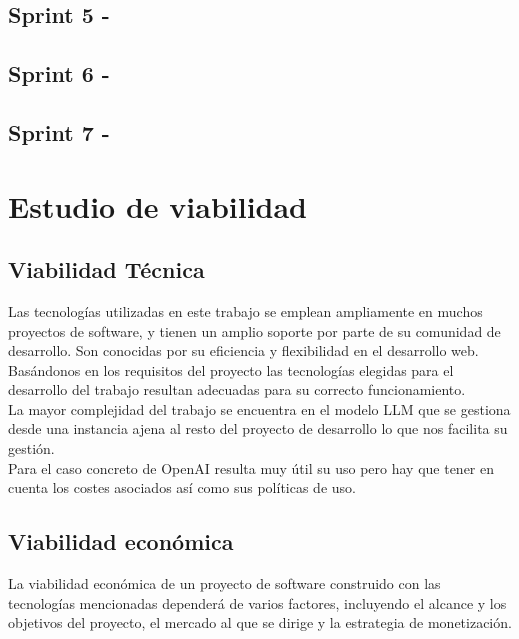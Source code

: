 \subsection{Sprint 5 - }
\subsection{Sprint 6 - }
\subsection{Sprint 7 - }

\section{Estudio de viabilidad}

\subsection{Viabilidad Técnica}

Las tecnologías utilizadas en este trabajo se emplean ampliamente en muchos proyectos de software, y 
tienen un amplio soporte por parte de su comunidad de desarrollo. Son conocidas por su eficiencia y 
flexibilidad en el desarrollo web.\\
Basándonos en los requisitos del proyecto las tecnologías elegidas para el desarrollo del trabajo 
resultan adecuadas para su correcto funcionamiento.\\
La mayor complejidad del trabajo se encuentra en el modelo LLM que se gestiona desde una instancia ajena al 
resto del proyecto de desarrollo lo que nos facilita su gestión.\\
Para el caso concreto de OpenAI resulta muy útil su uso pero hay que tener en cuenta los costes asociados 
así como sus políticas de uso.

\subsection{Viabilidad económica}
La viabilidad económica de un proyecto de software construido con las tecnologías 
mencionadas dependerá de varios factores, incluyendo el alcance y los objetivos del proyecto, 
el mercado al que se dirige y la estrategia de monetización.

